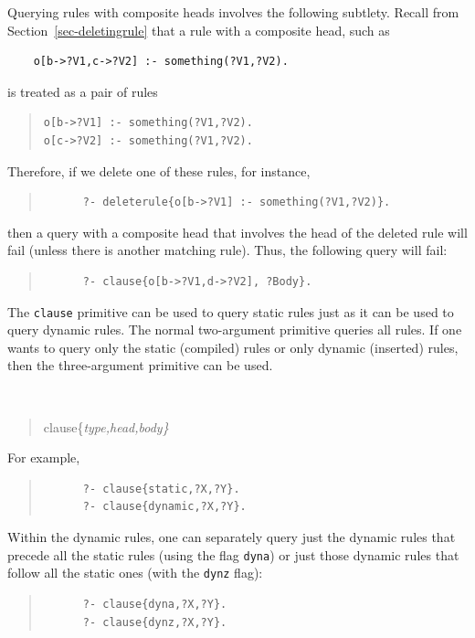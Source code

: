\documentclass[11pt]{article}
\begin{document}
Querying rules with composite heads involves the following  subtlety.
Recall from Section~\ref{sec-deletingrule} 
that a rule with a composite head, such as 
\begin{verbatim}
    o[b->?V1,c->?V2] :- something(?V1,?V2).     
\end{verbatim}
is treated as a pair of rules
\begin{quote}
\begin{verbatim}
o[b->?V1] :- something(?V1,?V2).     
o[c->?V2] :- something(?V1,?V2).     
\end{verbatim}
\end{quote}
Therefore, if we delete one of these rules, for instance,
\begin{quote}
\begin{verbatim}
      ?- deleterule{o[b->?V1] :- something(?V1,?V2)}.
\end{verbatim}
\end{quote}
then a query with a composite head that involves the head of the deleted
rule will fail (unless there is another matching rule).
Thus, the following query will fail:
\begin{quote}
\begin{verbatim}
      ?- clause{o[b->?V1,d->?V2], ?Body}.
\end{verbatim}
\end{quote}

The {\tt clause} primitive can be used to query static rules just as it can
be used to query dynamic rules.
The normal two-argument primitive queries all rules. If one wants to query
only the static (compiled) rules or only dynamic (inserted) rules, then the
three-argument primitive can be used.
{\tt
\begin{quote}
clause\{\it{type,head,body}\}
\end{quote}
}
\noindent
For example,
\begin{quote}
\begin{verbatim}
      ?- clause{static,?X,?Y}.
      ?- clause{dynamic,?X,?Y}.
\end{verbatim}
\end{quote}
Within the dynamic rules, one can separately query just the dynamic rules
that precede all the static rules (using the flag {\tt dyna}) or just those
dynamic rules that follow all the static ones (with the {\tt dynz} flag):
\begin{quote}
\begin{verbatim}
      ?- clause{dyna,?X,?Y}.
      ?- clause{dynz,?X,?Y}.
\end{verbatim}
\end{quote}
\end{document}
